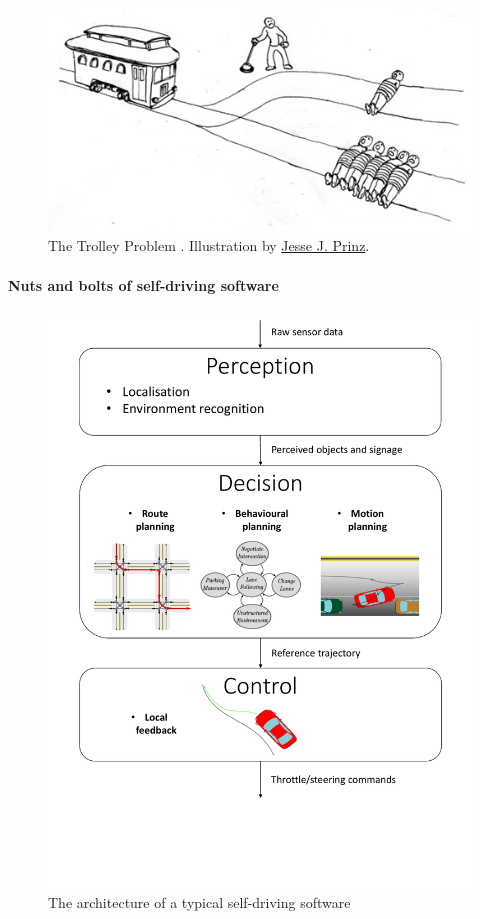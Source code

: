 \begin{figure}[tp]
	\centering
	\includegraphics[width=0.7\linewidth]{img/trolley}
	\caption{The Trolley Problem \citep{Foot1967}. Illustration by \href{http://subcortex.com/}{Jesse J. Prinz}.}
	\label{fig:trolley}
\end{figure}

\paragraph{Nuts and bolts of self-driving software}

\begin{figure}[tp]
	\centering
	\includegraphics[trim={0 5cm 0 0}, clip, width=0.8\linewidth]{img/pipeline}
	\caption{The architecture of a typical self-driving software}
	\label{fig:robotics-pipeline}
\end{figure}

